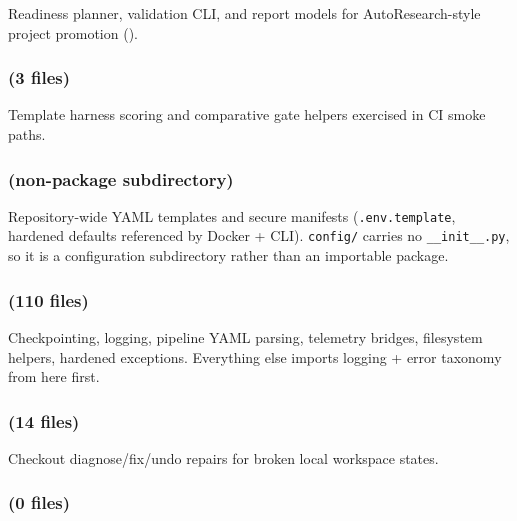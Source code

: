 \documentclass[
]{article}
\begin{document}
Readiness planner, validation CLI, and report models for
AutoResearch-style project promotion
().

\subsubsection{\texorpdfstring{ (3
files)}{infrastructure.benchmark (3 files)}}\label{infrastructure.benchmark-3-files}

Template harness scoring and comparative gate helpers exercised in CI
smoke paths.

\subsubsection{\texorpdfstring{
(non-package
subdirectory)}{infrastructure/config (non-package subdirectory)}}\label{infrastructureconfig-non-package-subdirectory}

Repository-wide YAML templates and secure manifests
(\texttt{.env.template}, hardened defaults referenced by Docker + CLI).
\texttt{config/} carries no \texttt{\_\_init\_\_.py}, so it is a
configuration subdirectory rather than an importable package.

\subsubsection{\texorpdfstring{ (110
files)}{infrastructure.core (110 files)}}\label{infrastructure.core-110-files}

Checkpointing, logging, pipeline YAML parsing, telemetry bridges,
filesystem helpers, hardened exceptions. Everything else imports logging
+ error taxonomy from here first.

\subsubsection{\texorpdfstring{ (14
files)}{infrastructure.doctor (14 files)}}\label{infrastructure.doctor-14-files}

Checkout diagnose/fix/undo repairs for broken local workspace states.

\subsubsection{\texorpdfstring{ (0
files)}{infrastructure.docker (0 files)}}\label{infrastructure.docker-0-files}
\end{document}
